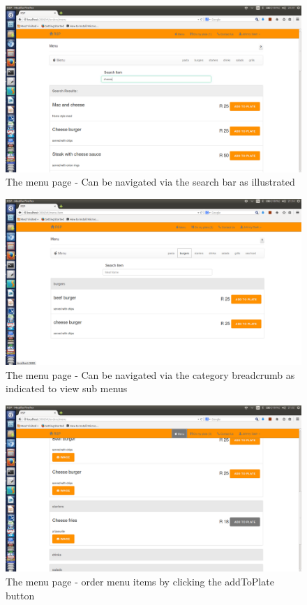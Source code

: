 \documentclass[a4paper,12pt]{article}
\begin{document}
\begin{figure}[H]
  \centering
    \includegraphics[width=1.0\textwidth]{screenshots/searchCheese.png}
    \caption{The menu page - Can be navigated via the search bar as illustrated} 
\end{figure}

\begin{figure}[H]
  \centering
    \includegraphics[width=1.0\textwidth]{screenshots/catMenu.png}
    \caption{The menu page - Can be navigated via the category breadcrumb as indicated to view sub menus} 
\end{figure}

\begin{figure}[H]
  \centering
    \includegraphics[width=1.0\textwidth]{screenshots/addToPlate.png}
    \caption{The menu page - order menu items by clicking the addToPlate button } 
\end{figure}
\end{document}
